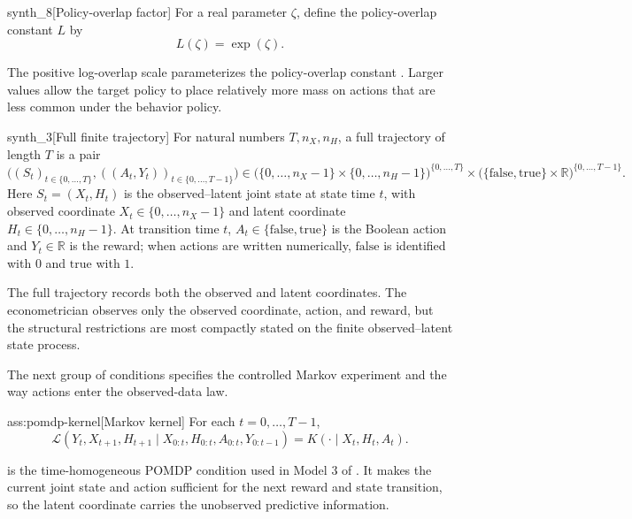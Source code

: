 \documentclass[11pt]{article}
\begin{document}
\begin{definitionv}{synth_8}[Policy-overlap factor]
For a real parameter \(\zeta\), define the policy-overlap constant \(L\) by
\[
L(\zeta)=\exp(\zeta).
\]
\end{definitionv}

The positive log-overlap scale  parameterizes the policy-overlap constant . Larger values allow the target policy to place relatively more mass on actions that are less common under the behavior policy.

\begin{definitionv}{synth_3}[Full finite trajectory]
For natural numbers \(T,n_X,n_H\), a full trajectory of length \(T\) is a pair
\[
\bigl((S_t)_{t\in\{0,\ldots,T\}},((A_t,Y_t))_{t\in\{0,\ldots,T-1\}}\bigr)
\in
\bigl(\{0,\ldots,n_X-1\}\times \{0,\ldots,n_H-1\}\bigr)^{\{0,\ldots,T\}}
\times
\bigl(\{\mathrm{false},\mathrm{true}\}\times \mathbb R\bigr)^{\{0,\ldots,T-1\}} .
\]
Here \(S_t=(X_t,H_t)\) is the observed--latent joint state at state time \(t\), with observed coordinate \(X_t\in\{0,\ldots,n_X-1\}\) and latent coordinate \(H_t\in\{0,\ldots,n_H-1\}\). At transition time \(t\), \(A_t\in\{\mathrm{false},\mathrm{true}\}\) is the Boolean action and \(Y_t\in\mathbb R\) is the reward; when actions are written numerically, \(\mathrm{false}\) is identified with \(0\) and \(\mathrm{true}\) with \(1\).
\end{definitionv}

The full trajectory records both the observed and latent coordinates. The econometrician observes only the observed coordinate, action, and reward, but the structural restrictions are most compactly stated on the finite observed--latent state process.

The next group of conditions specifies the controlled Markov experiment and the way actions enter the observed-data law.

\begin{assumptionv}{ass:pomdp-kernel}[Markov kernel]
For each \(t=0,\ldots,T-1\),
\[
\mathcal L(Y_t,X_{t+1},H_{t+1}\mid X_{0:t},H_{0:t},A_{0:t},Y_{0:t-1})
=
K(\cdot\mid X_t,H_t,A_t).
\]
\end{assumptionv}

 is the time-homogeneous POMDP condition used in Model 3 of \citet{HuWager2023}. It makes the current joint state and action sufficient for the next reward and state transition, so the latent coordinate carries the unobserved predictive information.
\end{document}
